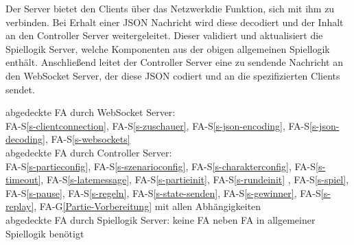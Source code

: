 \newpage
Der Server bietet den Clients über das \glqq Netzwerk\grqq die Funktion, sich mit ihm zu verbinden. Bei Erhalt einer JSON Nachricht wird diese decodiert und der Inhalt an den Controller Server weitergeleitet. Dieser validiert und aktualisiert die Spiellogik Server, welche Komponenten aus der obigen allgemeinen Spiellogik enthält. Anschließend leitet der Controller Server eine zu sendende Nachricht an den WebSocket Server, der diese JSON codiert und an die spezifizierten Clients sendet.\\ 
\newline
abgedeckte FA durch WebSocket Server:\\
FA-S\ref{s-clientconnection}, FA-S\ref{s-zuschauer},  FA-S\ref{s-json-encoding}, FA-S\ref{s-json-decoding}, FA-S\ref{s-websockets}\\
abgedeckte FA durch Controller Server:\\
FA-S\ref{s-partieconfig}, FA-S\ref{s-szenarioconfig}, FA-S\ref{s-charakterconfig}, FA-S\ref{s-timeout}, FA-S\ref{s-latemessage}, FA-S\ref{s-partieinit}, FA-S\ref{s-rundeinit} , FA-S\ref{s-spiel}, FA-S\ref{s-pause}, FA-S\ref{s-regeln}, FA-S\ref{s-state-senden}, FA-S\ref{s-gewinner},  FA-S\ref{s-replay}, FA-G\ref{Partie-Vorbereitung} mit allen Abhängigkeiten\\
abgedeckte FA durch Spiellogik Server: keine FA neben FA in allgemeiner Spiellogik benötigt\\


